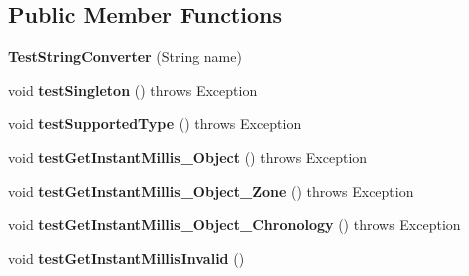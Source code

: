 \subsection*{Public Member Functions}
\begin{DoxyCompactItemize}
\item 
\hypertarget{classorg_1_1joda_1_1time_1_1convert_1_1_test_string_converter_a0191b9d06a80f44e2f1990b4e6995d5f}{{\bfseries Test\-String\-Converter} (String name)}\label{classorg_1_1joda_1_1time_1_1convert_1_1_test_string_converter_a0191b9d06a80f44e2f1990b4e6995d5f}

\item 
\hypertarget{classorg_1_1joda_1_1time_1_1convert_1_1_test_string_converter_afa14ebe7c88c5174860096573d7c21c1}{void {\bfseries test\-Singleton} ()  throws Exception }\label{classorg_1_1joda_1_1time_1_1convert_1_1_test_string_converter_afa14ebe7c88c5174860096573d7c21c1}

\item 
\hypertarget{classorg_1_1joda_1_1time_1_1convert_1_1_test_string_converter_a62bfc46f38e947194bc22fcde73e4d4a}{void {\bfseries test\-Supported\-Type} ()  throws Exception }\label{classorg_1_1joda_1_1time_1_1convert_1_1_test_string_converter_a62bfc46f38e947194bc22fcde73e4d4a}

\item 
\hypertarget{classorg_1_1joda_1_1time_1_1convert_1_1_test_string_converter_a11f1e2cfb55b93e454217e68a6f7575d}{void {\bfseries test\-Get\-Instant\-Millis\-\_\-\-Object} ()  throws Exception }\label{classorg_1_1joda_1_1time_1_1convert_1_1_test_string_converter_a11f1e2cfb55b93e454217e68a6f7575d}

\item 
\hypertarget{classorg_1_1joda_1_1time_1_1convert_1_1_test_string_converter_ab37259c8ac318e9b057c1b4aab1bb36a}{void {\bfseries test\-Get\-Instant\-Millis\-\_\-\-Object\-\_\-\-Zone} ()  throws Exception }\label{classorg_1_1joda_1_1time_1_1convert_1_1_test_string_converter_ab37259c8ac318e9b057c1b4aab1bb36a}

\item 
\hypertarget{classorg_1_1joda_1_1time_1_1convert_1_1_test_string_converter_a66420573b2318ed55b46b03fcfef5133}{void {\bfseries test\-Get\-Instant\-Millis\-\_\-\-Object\-\_\-\-Chronology} ()  throws Exception }\label{classorg_1_1joda_1_1time_1_1convert_1_1_test_string_converter_a66420573b2318ed55b46b03fcfef5133}

\item 
\hypertarget{classorg_1_1joda_1_1time_1_1convert_1_1_test_string_converter_a2481e58022951a263a11351802b9249f}{void {\bfseries test\-Get\-Instant\-Millis\-Invalid} ()}\label{classorg_1_1joda_1_1time_1_1convert_1_1_test_string_converter_a2481e58022951a263a11351802b9249f}


\end{DoxyCompactItemize}
